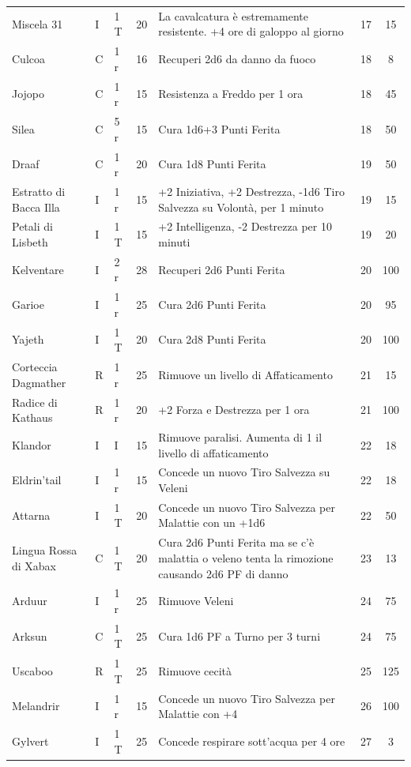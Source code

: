 \begin{xltabular}{\linewidth}{llllXcc}
 Miscela 31 & I& 1 T & 20&La cavalcatura è estremamente resistente. +4 ore di galoppo al giorno & 17 & 15\\
	Culcoa & C& 1 r & 16& Recuperi 2d6 da danno da fuoco & 18 & 8 \\
 Jojopo & C& 1 r & 15& Resistenza a Freddo per 1 ora & 18 & 45 \\
	Silea & C& 5 r& 15& Cura 1d6+3 Punti Ferita & 18 & 50 \\
 Draaf & C& 1 r & 20& Cura 1d8 Punti Ferita& 19 & 50 \\
	Estratto di Bacca Illa & I& 1 r & 15& +2 Iniziativa, +2 Destrezza, -1d6 Tiro Salvezza su Volontà, per 1 minuto& 19 & 15\\
 Petali di Lisbeth & I& 1 T & 15&+2 Intelligenza, -2 Destrezza per 10 minuti & 19 & 20 \\
	Kelventare & I& 2 r & 28& Recuperi 2d6 Punti Ferita & 20 & 100 \\
 Garioe & I& 1 r & 25& Cura 2d6 Punti Ferita& 20 & 95 \\
	Yajeth & I& 1 T& 20& Cura 2d8 Punti Ferita& 20 & 100 \\
 Corteccia Dagmather & R& 1 r & 25& Rimuove un livello di Affaticamento& 21 & 15 \\
	Radice di Kathaus & R& 1 r& 20& +2 Forza e Destrezza per 1 ora & 21 & 100 \\
 Klandor & I& I& 15& Rimuove paralisi. Aumenta di 1 il livello di affaticamento& 22 & 18 \\
	Eldrin'tail & I& 1 r& 15& Concede un nuovo Tiro Salvezza su Veleni& 22 & 18 \\
 Attarna & I& 1 T & 20& Concede un nuovo Tiro Salvezza per Malattie con un +1d6& 22 & 50 \\
	Lingua Rossa di Xabax & C& 1 T & 20& Cura 2d6 Punti Ferita ma se c'è malattia o veleno tenta la rimozione causando 2d6 PF di danno & 23 & 13 \\
 Arduur & I& 1 r & 25& Rimuove Veleni& 24 & 75 \\
	Arksun & C& 1 T& 25& Cura 1d6 PF a Turno per 3 turni& 24 & 75 \\
 Uscaboo & R& 1 T & 25& Rimuove cecità& 25 & 125 \\
	Melandrir & I& 1 r & 15& Concede un nuovo Tiro Salvezza per Malattie con +4& 26 & 100 \\
 Gylvert & I& 1 T& 25& Concede respirare sott'acqua per 4 ore & 27 & 3 \\

\end{xltabular}
